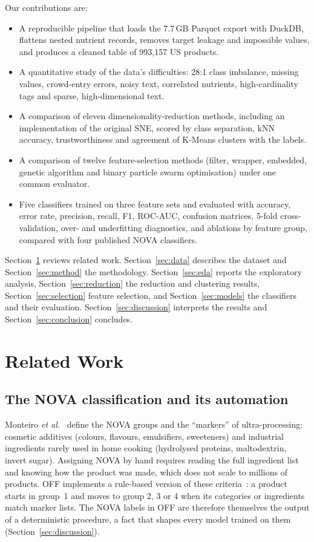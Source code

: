 \documentclass[conference]{IEEEtran}
\begin{document}
Our contributions are:
\begin{itemize}
    \item A reproducible pipeline that loads the 7.7\,GB Parquet export with DuckDB, flattens nested nutrient records, removes target leakage and impossible values, and produces a cleaned table of 993,157 US products.
    \item A quantitative study of the data's difficulties: 28:1 class imbalance, missing values, crowd-entry errors, noisy text, correlated nutrients, high-cardinality tags and sparse, high-dimensional text.
    \item A comparison of eleven dimensionality-reduction methods, including an implementation of the original SNE, scored by class separation, kNN accuracy, trustworthiness and agreement of K-Means clusters with the labels.
    \item A comparison of twelve feature-selection methods (filter, wrapper, embedded, genetic algorithm and binary particle swarm optimisation) under one common evaluator.
    \item Five classifiers trained on three feature sets and evaluated with accuracy, error rate, precision, recall, F1, ROC-AUC, confusion matrices, 5-fold cross-validation, over- and underfitting diagnostics, and ablations by feature group, compared with four published NOVA classifiers.
\end{itemize}

Section~\ref{sec:related} reviews related work. Section~\ref{sec:data} describes the dataset and Section~\ref{sec:method} the methodology. Section~\ref{sec:eda} reports the exploratory analysis, Section~\ref{sec:reduction} the reduction and clustering results, Section~\ref{sec:selection} feature selection, and Section~\ref{sec:models} the classifiers and their evaluation. Section~\ref{sec:discussion} interprets the results and Section~\ref{sec:conclusion} concludes.

\section{Related Work}
\label{sec:related}

\subsection{The NOVA classification and its automation}
Monteiro \emph{et al.}~\cite{monteiro2019nova} define the NOVA groups and the ``markers'' of ultra-processing: cosmetic additives (colours, flavours, emulsifiers, sweeteners) and industrial ingredients rarely used in home cooking (hydrolysed proteins, maltodextrin, invert sugar). Assigning NOVA by hand requires reading the full ingredient list and knowing how the product was made, which does not scale to millions of products. OFF implements a rule-based version of these criteria~\cite{offnova}: a product starts in group~1 and moves to group 2, 3 or 4 when its categories or ingredients match marker lists. The NOVA labels in OFF are therefore themselves the output of a deterministic procedure, a fact that shapes every model trained on them (Section~\ref{sec:discussion}).
\end{document}
